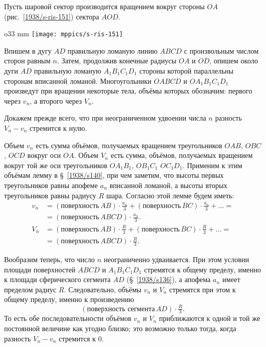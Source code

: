Пусть шаровой сектор производится вращением вокруг стороны $OA$ (рис.~\ref{1938/s-ris-151}) сектора $AOD$.

\begin{wrapfigure}{o}{33 mm}
\vskip-0mm
\centering
\texttt{[image: mppics/s-ris-151]}
\caption{}\label{1938/s-ris-151}
\vskip-0mm
\end{wrapfigure}

Впишем в дугу $AD$ правильную ломаную линию $ABCD$ с произвольным числом сторон равным $n$.
Затем, продолжив конечные радиусы $OA$ и $OD$, опишем около дуги $AD$ правильную ломаную $A_1B_1C_1D_1$ стороны которой параллельны сторонам вписанной ломаной.
Многоугольники $OABCD$ и $OA_1B_1C_1D_1$ произведут при вращении некоторые тела, объёмы которых обозначим: первого через $v_n$, а второго через $V_n$.

Докажем прежде всего, что при неограниченном удвоении числа $n$ разность $V_n-v_n$ стремится к нулю.

Объем $v_n$ есть сумма объёмов, получаемых вращением треугольников $OAB$, $OBC$, $OCD$ вокруг оси $OA$.
Объем $V_n$ есть сумма, объёмов, получаемых вращением вокруг той же оси треугольников $OA_1B_1$, $OB_1C_1$ $OC_1D_1$.
Применим к этим объёмам лемму в §~\ref{1938/s140}, при чем заметим, что высоты первых треугольников равны апофеме $a_n$ вписанной ломаной, а высоты вторых треугольников равны радиусу $R$ шара.
Согласно этой лемме будем иметь:
\begin{align*}
v_n&=
(\text{поверхность}\, AB)\cdot\tfrac {a_n}3
+
(\text{поверхность}\, BC)\cdot\tfrac {a_n}3
+
\dots=
\\
&=
(\text{поверхность}\, ABCD)\cdot \tfrac {a_n}3.
\\
V_n&=
(\text{поверхность}\, AB)\cdot\tfrac R3
+
(\text{поверхность}\, BC)\cdot\tfrac R3
+
\dots=
\\
&=
(\text{поверхность}\, ABCD)\cdot \tfrac R3.
\end{align*}


Вообразим теперь, что число $n$ неограниченно удваивается.
При этом условии площади поверхностей $ABCD$ и $A_1B_1C_1D_1$ стремятся к общему пределу, именно к площади сферического сегмента $AD$ (§~\ref{1938/s136}), а апофема $a_n$ имеет пределом радиус $R$.
Следовательно, объёмы $v_n$ и $V_n$ стремятся при этом к общему пределу, именно к произведению 
\[(\text{поверхность сегмента}\,  AD)\cdot \tfrac R3.\]
То есть обе последовательности объёмов $v_n$ и $V_n$ приближаются к одной и той же постоянной величине как угодно близко; это возможно только тогда, когда разность $V_n-v_n$ стремится к $0$.

